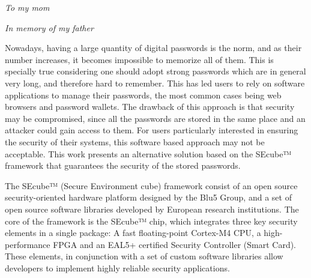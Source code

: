 \documentclass[%
    corpo=13pt,
    twoside,
    oldstyle,
    autoretitolo,
    greek,
    evenboxes,
    numerazioneromana,
    tipotesi=magistrale,
]{toptesi}
\begin{document}
 \frontespizio %
 
%
   

\frontmatter


\begin{flushright}
\vspace*{30pt}
\noindent
{\Large\textit{To my mom}}

{\Large\textit{\textdagger \hspace{1pt} In memory of my father}}

\end{flushright}
\listoftodos

\sommario

Nowadays, having a large quantity of digital passwords is the norm, and as their number increases, it becomes impossible to memorize all of them. This is specially true considering one should adopt strong passwords which are in general very long, and therefore hard to remember. This has led users to rely on software applications to manage their passwords, the most common cases being web browsers and password wallets. The drawback of this approach is that security may be compromised, since all the passwords are stored in the same place and an attacker could gain access to them. For users particularly interested in ensuring the security of their systems, this software based approach may not be acceptable. This work presents an alternative solution based on the SEcube™ framework that guarantees the security of the stored passwords.

The SEcube™ (Secure Environment cube) framework consist of an open source security-oriented hardware platform designed by the Blu5 Group, and a set of open source software libraries developed by European research institutions. The core of the framework is the SEcube™ chip, which integrates three key security elements in a single package: A fast floating-point Cortex-M4 CPU, a high-performance FPGA and an EAL5+ certified Security Controller (Smart Card). These elements, in conjunction with a set of custom software libraries allow developers to implement highly reliable security applications.
\end{document}
